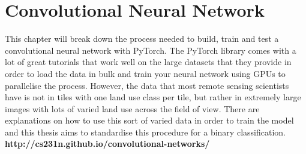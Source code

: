 \chapter{Convolutional Neural Network}
This chapter will break down the process needed to build, train and test a convolutional neural network with PyTorch. The PyTorch library comes with a lot of great tutorials that work well on the large datasets that they provide in order to load the data in bulk and train your neural network using GPUs to parallelise the process. However, the data that most remote sensing scientists have is not in tiles with one land use class per tile, but rather in extremely large images with lots of varied land use across the field of view. There are explanations on how to use this sort of varied data in order to train the model and this thesis aims to standardise this procedure for a binary classification. \newline
\textbf{http://cs231n.github.io/convolutional-networks/}
